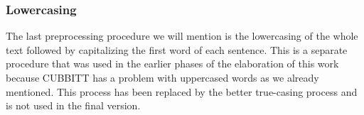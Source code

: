 \subsubsection*{Lowercasing}
The last preprocessing procedure we will mention is the lowercasing of the whole text followed by capitalizing the first word of each sentence. This is a separate procedure that was used in the earlier phases of the elaboration of this work because CUBBITT has a problem with uppercased words as we already mentioned. This process has been replaced by the better true-casing process and is not used in the final version.















